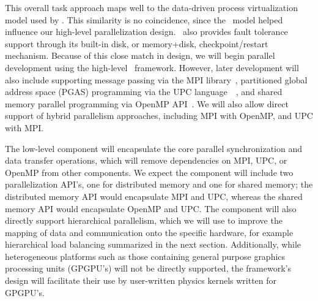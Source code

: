 \documentclass[11pt,letterpaper]{article}
\begin{document}

% 

%
This overall task approach maps well to the data-driven process
virtualization model used by \charm.
This similarity is no coincidence, since the \charm\ model helped
influence our high-level parallelization design.  \charm\ also
provides fault tolerance support through its built-in disk, or
memory+disk, checkpoint/restart mechanism.  Because of this close
match in design, we will begin parallel development using the
high-level \charm\ framework.  However, later development will also
include supporting message passing via the MPI library~\cite{wwwmpi},
partitioned global address space (PGAS) programming via the UPC
language~\cite{wwwupc}~\cite{upc}, and shared memory parallel
programming via OpenMP API~\cite{wwwopenmp}.  We will also allow
direct support of hybrid parallelism approaches, including MPI with
OpenMP, and UPC with MPI.

The low-level  component will encapsulate the core
parallel synchronization and data transfer operations, which will
remove dependencies on MPI, UPC, or OpenMP from other components.  We
expect the  component will include two parallelization
API's, one for distributed memory and one for shared memory; the
distributed memory API would encapsulate MPI and UPC, whereas the
shared memory API would encapsulate OpenMP and UPC.  The
 component will also directly support hierarchical
parallelism, which we will use to improve the mapping of data and
communication onto the specific hardware, for example hierarchical
load balancing summarized in the next section.  Additionally, while
heterogeneous platforms such as those containing general purpose
graphics processing units (GPGPU's) will not be directly supported,
the framework's design will facilitate their use by user-written
physics kernels written for GPGPU's.
\end{document}
